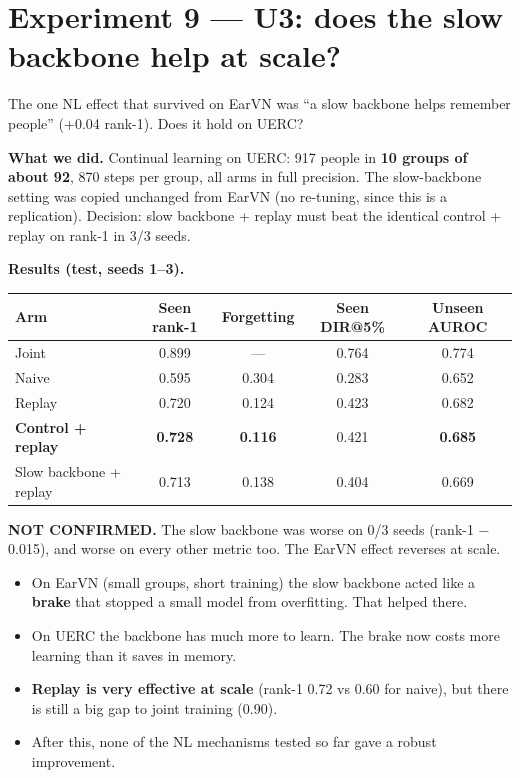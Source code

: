 \documentclass[11pt,a4paper]{article}
\begin{document}
\section{Experiment 9 --- U3: does the slow backbone help at scale?}

\begin{question}
The one NL effect that survived on EarVN was ``a slow backbone helps remember people'' (+0.04 rank-1). Does it hold on UERC?
\end{question}

\textbf{What we did.} Continual learning on UERC: 917 people in \textbf{10 groups of about 92}, 870 steps per group, all arms in full precision. The slow-backbone setting was copied unchanged from EarVN (no re-tuning, since this is a replication). Decision: slow backbone + replay must beat the identical control + replay on rank-1 in 3/3 seeds.

\textbf{Results (test, seeds 1--3).}
\begin{center}
\begin{tabular}{@{}lcccc@{}}
\toprule
\textbf{Arm} & \textbf{Seen rank-1} & \textbf{Forgetting} & \textbf{Seen DIR@5\%} & \textbf{Unseen AUROC}\\
\midrule
Joint & 0.899 & --- & 0.764 & 0.774\\
Naive & 0.595 & 0.304 & 0.283 & 0.652\\
Replay & 0.720 & 0.124 & 0.423 & 0.682\\
\textbf{Control + replay} & \textbf{0.728} & \textbf{0.116} & 0.421 & \textbf{0.685}\\
Slow backbone + replay & 0.713 & 0.138 & 0.404 & 0.669\\
\bottomrule
\end{tabular}
\end{center}

\begin{verdict}
\textbf{NOT CONFIRMED.} The slow backbone was worse on 0/3 seeds (rank-1 $-$0.015), and worse on every other metric too. The EarVN effect reverses at scale.
\end{verdict}

\begin{means}
\begin{itemize}[leftmargin=1.2em]
  \item On EarVN (small groups, short training) the slow backbone acted like a \textbf{brake} that stopped a small model from overfitting. That helped there.
  \item On UERC the backbone has much more to learn. The brake now costs more learning than it saves in memory.
  \item \textbf{Replay is very effective at scale} (rank-1 0.72 vs 0.60 for naive), but there is still a big gap to joint training (0.90).
  \item After this, none of the NL mechanisms tested so far gave a robust improvement.
\end{itemize}
\end{means}
\end{document}
